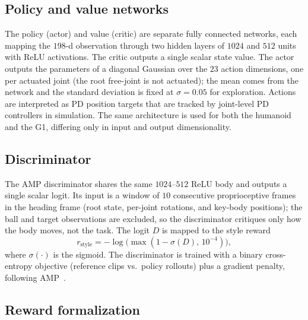 \documentclass[10pt,twocolumn,letterpaper]{article}
\begin{document}
\subsection{Policy and value networks}
\label{sec:network}
The policy (actor) and value (critic) are separate fully connected networks,
each mapping the $198$-d observation through two hidden layers of $1024$ and
$512$ units with ReLU activations. The critic outputs a single scalar state
value. The actor outputs the parameters of a diagonal Gaussian over the $23$
action dimensions, one per actuated joint (the root free-joint is not
actuated); the mean comes from the network and the standard deviation is fixed
at $\sigma = 0.05$ for exploration. Actions are interpreted as PD position
targets that are tracked by joint-level PD controllers in simulation. The same
architecture is used for both the humanoid and the G1, differing only in input
and output dimensionality.

\subsection{Discriminator}
\label{sec:disc}
The AMP discriminator shares the same $1024$--$512$ ReLU body and outputs a
single scalar logit. Its input is a window of $10$ consecutive proprioceptive
frames in the heading frame (root state, per-joint rotations, and key-body
positions); the ball and target observations are excluded, so the
discriminator critiques only how the body moves, not the task. The logit $D$ is
mapped to the style reward
\begin{equation}
    r_\text{style} = -\log\!\bigl(\max(1 - \sigma(D),\, 10^{-4})\bigr),
\end{equation}
where $\sigma(\cdot)$ is the sigmoid. The discriminator is trained with a binary
cross-entropy objective (reference clips vs.\ policy rollouts) plus a gradient
penalty, following AMP~\cite{peng2021amp}.

\subsection{Reward formalization}
\label{sec:reward}

\end{document}
